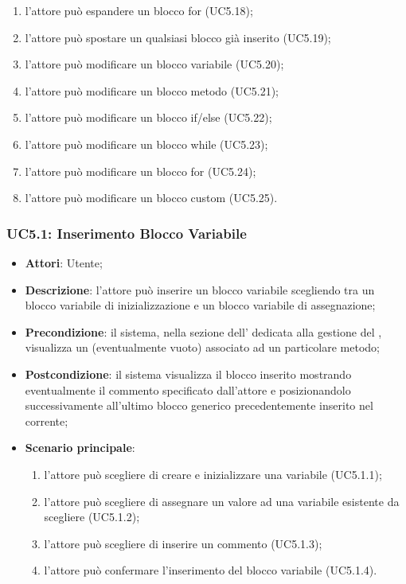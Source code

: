 \begin{itemize}
\begin{enumerate}
\item l'attore può espandere un blocco for (UC5.18);
\item l'attore può spostare un qualsiasi blocco già inserito (UC5.19);
\item l'attore può modificare un blocco variabile (UC5.20);
\item l'attore può modificare un blocco metodo (UC5.21);
\item l'attore può modificare un blocco if/else (UC5.22);
\item l'attore può modificare un blocco while (UC5.23);
\item l'attore può modificare un blocco for (UC5.24);
\item l'attore può modificare un blocco custom (UC5.25).
\end{enumerate}
\end{itemize}

\subsubsection{UC5.1: Inserimento Blocco Variabile}
\label{UC5.1}
\begin{itemize}
\item \textbf{Attori}: Utente;
\item \textbf{Descrizione}: l'attore può inserire un blocco variabile scegliendo tra un blocco variabile di inizializzazione e un blocco variabile di assegnazione;
\item \textbf{Precondizione}: il sistema, nella sezione dell' dedicata alla gestione del , visualizza un  (eventualmente vuoto) associato ad un particolare metodo;
\item \textbf{Postcondizione}: il sistema visualizza il blocco inserito mostrando eventualmente il commento specificato dall'attore e posizionandolo successivamente all'ultimo blocco generico precedentemente inserito nel  corrente;
\item \textbf{Scenario principale}:
\begin{enumerate}
\item l'attore può scegliere di creare e inizializzare una variabile (UC5.1.1);
\item l'attore può scegliere di assegnare un valore ad una variabile esistente da scegliere (UC5.1.2);
\item l'attore può scegliere di inserire un commento (UC5.1.3);
\item l'attore può confermare l'inserimento del blocco variabile (UC5.1.4).
\end{enumerate}
\end{itemize}

